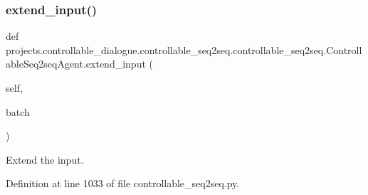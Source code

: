 \subsubsection{\texorpdfstring{extend\+\_\+input()}{extend\_input()}}
{\footnotesize\ttfamily def projects.\+controllable\+\_\+dialogue.\+controllable\+\_\+seq2seq.\+controllable\+\_\+seq2seq.\+Controllable\+Seq2seq\+Agent.\+extend\+\_\+input (\begin{DoxyParamCaption}\item[{}]{self,  }\item[{}]{batch }\end{DoxyParamCaption})}

\begin{DoxyVerb}Extend the input.
\end{DoxyVerb}
 

Definition at line 1033 of file controllable\+\_\+seq2seq.\+py.


